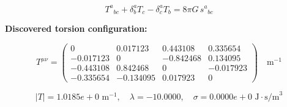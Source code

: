 
\begin{equation}
  T^a{}_{bc} + \delta^a_b T_c - \delta^a_c T_b = 8\pi G \, s^a{}_{bc}
\end{equation}

\textbf{Discovered torsion configuration:}

\begin{equation}
  T^{\mu\nu} = \begin{pmatrix}
    0 & 0.017123 & 0.443108 & 0.335654 \\
    -0.017123 & 0 & -0.842468 & 0.134095 \\
    -0.443108 & 0.842468 & 0 & -0.017923 \\
    -0.335654 & -0.134095 & 0.017923 & 0
  \end{pmatrix} \quad \text{m}^{-1}
\end{equation}

\begin{equation}
  |T| = 1.0185e+0 \text{ m}^{-1}, \quad
  \lambda = -10.0000, \quad
  \sigma = 0.0000e+0 \text{ J}\cdot\text{s/m}^3
\end{equation}